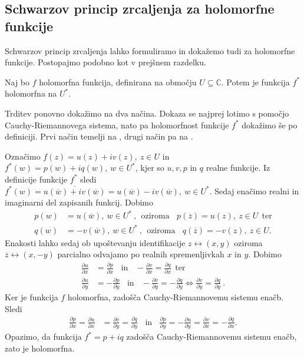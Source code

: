 \documentclass[mat1, tisk]{fmfdelo}
\begin{document}
\subsection{Schwarzov princip zrcaljenja za holomorfne funkcije}

    Schwarzov princip zrcaljenja lahko formuliramo in dokažemo tudi za holomorfne funkcije. 
    Postopajmo podobno kot v prejšnem razdelku.

    \begin{lema}
        \label{lemahol}
        Naj bo $f$ holomorfna funkcija, definirana na območju $U \subseteq \mathbb{C}$.
        Potem je funkcija $f^*$ holomorfna na $U^*$.
    \end{lema}
    \begin{dokaz}
        Trditev ponovno dokažimo na dva načina. Dokaza se najprej lotimo s pomočjo Cauchy-Riemannovega sistema, nato pa holomorfnost funkcije $f^*$ dokažimo še po definiciji.
        Prvi način temelji na \cite[stran 2]{mckernan}, drugi način pa na \cite[poglavje 6.7.1. trditev 15]{skripta_ana2}.
        
        Označimo $f(z) = u(z) + iv(z),~ z \in U$ in $f^*(w) = p(w) + iq(w),~w \in U^*$, kjer so $u,v, p$ in $q$ realne funkcije. 
        Iz definicije funkcije $f^*$ sledi $f^*(w) = \overline{u(\overline{w}) + iv(\overline{w})} = u(\overline{w}) - iv(\overline{w}),~ w \in U^*$. 
        Sedaj enačimo realni in imaginarni del zapisanih funkcij. Dobimo
        \begin{align*}
            p(w) &= u(\overline{w}),~w \in U^*~,~~\text{oziroma}~~~~p(\overline{z}) = u(z),~z \in U~~\text{ter} \\
            q(w) &= -v(\overline{w}),~w \in U^*~,~~\text{oziroma}~~~~q(\overline{z}) = -v(z),~z \in U.
        \end{align*}
        Enakosti lahko sedaj ob upoštevanju identifikacije $z \leftrightarrow (x,y)$ oziroma $\overline{z} \leftrightarrow (x, -y)$ parcialno odvajamo po realnih spremenljivkah $x$ in $y$. Dobimo
        \begin{align*}
            \frac{\partial u}{\partial x} &= \frac{\partial p}{\partial x}~~~~\text{in}~~~~ -\frac{\partial v}{\partial x} = \frac{\partial q}{\partial x}~~\text{ter}\\
            \frac{\partial u}{\partial y} &=  - \frac{\partial p}{\partial y}~~~~\text{in}~~~~ -\frac{\partial v}{\partial y} = - \frac{\partial q}{\partial y} \iff \frac{\partial v}{\partial y} = \frac{\partial q}{\partial y}~.      
        \end{align*}
        Ker je funkcija $f$ holomorfna, zadošča Cauchy-Riemannovemu sistemu enačb.  
        Sledi
        \begin{align*}
            \frac{\partial p}{\partial x} = \frac{\partial u}{\partial x} &= \frac{\partial v}{\partial y} = \frac{\partial q}{\partial y}~~~~\text{in}~~~~ \frac{\partial p}{\partial y} = -\frac{\partial u}{\partial y} = \frac{\partial v}{\partial x} = -\frac{\partial q}{\partial x}.
        \end{align*}
        Opazimo, da funkcija $f^* = p + iq$ zadošča Cauchy-Riemannovemu sistemu enačb, zato je holomorfna.


\end{dokaz}
\end{document}
